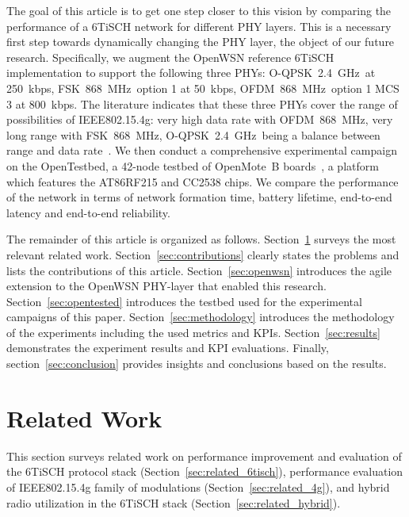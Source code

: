 \documentclass[sensors,article,submit,moreauthors,pdftex]{Definitions/mdpi}
\newcommand{\fsk}           {FSK~868~MHz}
\newcommand{\oqpsk}         {O-QPSK~2.4~GHz}
\newcommand{\ofdm}          {OFDM~868~MHz}
\begin{document}

The goal of this article is to get one step closer to this vision by comparing the performance of a 6TiSCH network for different PHY layers.
This is a necessary first step towards dynamically changing the PHY layer,
    the object of our future research.
Specifically, we augment the OpenWSN reference 6TiSCH implementation to support the following three PHYs:
    \oqpsk\ at 250~kbps,
    \fsk\ option 1 at 50~kbps,
    \ofdm\  option 1 MCS 3 at 800~kbps.
The literature indicates that these three PHYs cover the range of possibilities of IEEE802.15.4g:
    very high data rate with \ofdm,
    very long range with \fsk,
    \oqpsk\ being a balance between range and data rate~\cite{munoz19km,draft-munoz-6tisch-multi-phy-nodes,brachmann19ieee}.
We then conduct a comprehensive experimental campaign on the OpenTestbed, a 42-node testbed of OpenMote~B boards~\cite{tuset16openmote}, a platform which features the AT86RF215 and CC2538 chips.
We compare the performance of the network in terms of
    network formation time,
    battery lifetime,
    end-to-end latency and
    end-to-end reliability.


The remainder of this article is organized as follows.
Section~\ref{sec:related} surveys the most relevant related work.
Section~\ref{sec:contributions} clearly states the problems and lists the contributions of this article.
Section~\ref{sec:openwsn} introduces the agile extension to the OpenWSN PHY-layer that enabled this research.
Section~\ref{sec:opentested} introduces the testbed used for the experimental campaigns of this paper.
Section~\ref{sec:methodology} introduces the methodology of the experiments including the used metrics and KPIs.
Section~\ref{sec:results} demonstrates the experiment results and KPI evaluations.
Finally, section~\ref{sec:conclusion} provides insights and conclusions based on the results.

\section{Related Work}
\label{sec:related}


This section surveys related work on
    performance improvement and evaluation of the 6TiSCH protocol stack (Section~\ref{sec:related_6tisch}),
    performance evaluation of IEEE802.15.4g family of modulations (Section~\ref{sec:related_4g}), and
    hybrid radio utilization in the 6TiSCH stack  (Section~\ref{sec:related_hybrid}). 
\end{document}

